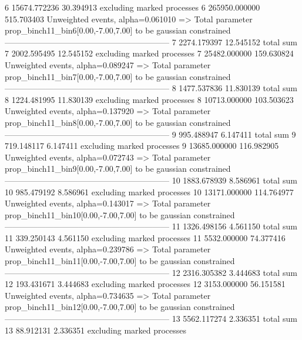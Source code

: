 6          15674.772236    30.394913       excluding marked processes    
6          265950.000000   515.703403      Unweighted events, alpha=0.061010
  => Total parameter prop_binch11_bin6[0.00,-7.00,7.00] to be gaussian constrained
------------------------------------------------------------
7          2274.179397     12.545152       total sum                     
7          2002.595495     12.545152       excluding marked processes    
7          25482.000000    159.630824      Unweighted events, alpha=0.089247
  => Total parameter prop_binch11_bin7[0.00,-7.00,7.00] to be gaussian constrained
------------------------------------------------------------
8          1477.537836     11.830139       total sum                     
8          1224.481995     11.830139       excluding marked processes    
8          10713.000000    103.503623      Unweighted events, alpha=0.137920
  => Total parameter prop_binch11_bin8[0.00,-7.00,7.00] to be gaussian constrained
------------------------------------------------------------
9          995.488947      6.147411        total sum                     
9          719.148117      6.147411        excluding marked processes    
9          13685.000000    116.982905      Unweighted events, alpha=0.072743
  => Total parameter prop_binch11_bin9[0.00,-7.00,7.00] to be gaussian constrained
------------------------------------------------------------
10         1883.678939     8.586961        total sum                     
10         985.479192      8.586961        excluding marked processes    
10         13171.000000    114.764977      Unweighted events, alpha=0.143017
  => Total parameter prop_binch11_bin10[0.00,-7.00,7.00] to be gaussian constrained
------------------------------------------------------------
11         1326.498156     4.561150        total sum                     
11         339.250143      4.561150        excluding marked processes    
11         5532.000000     74.377416       Unweighted events, alpha=0.239786
  => Total parameter prop_binch11_bin11[0.00,-7.00,7.00] to be gaussian constrained
------------------------------------------------------------
12         2316.305382     3.444683        total sum                     
12         193.431671      3.444683        excluding marked processes    
12         3153.000000     56.151581       Unweighted events, alpha=0.734635
  => Total parameter prop_binch11_bin12[0.00,-7.00,7.00] to be gaussian constrained
------------------------------------------------------------
13         5562.117274     2.336351        total sum                     
13         88.912131       2.336351        excluding marked processes    
